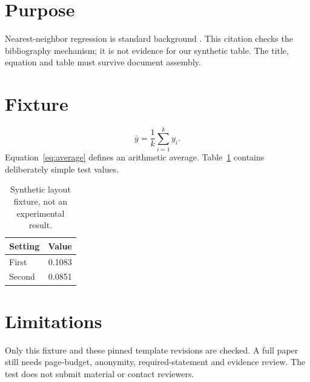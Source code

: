 \begin{abstract}
This original fixture tests document assembly. It is not a submitted or accepted
paper. It exercises a title, an equation, a table, and a citation
under an unchanged official conference style. The data are synthetic test
values, not scientific measurements. Template compilation does not establish
novelty, scientific validity, or complete submission compliance.
\end{abstract}
\section{Purpose}
Nearest-neighbor regression is standard background \cite{hastie2009}.
This citation checks the bibliography mechanism; it is not evidence for our
synthetic table. The title, equation and table must survive document assembly.
\section{Fixture}
\begin{equation}\label{eq:average}
\bar{y}=\frac{1}{k}\sum_{i=1}^{k}y_i.
\end{equation}
Equation~\ref{eq:average} defines an arithmetic average.
Table~\ref{tab:fixture} contains deliberately simple test values.
\begin{table}[h]
\centering
\caption{Synthetic layout fixture, not an experimental result.}
\label{tab:fixture}
\begin{tabular}{lr}
\toprule
Setting & Value \\
\midrule
First & 0.1083 \\
Second & 0.0851 \\
\bottomrule
\end{tabular}
\end{table}
\section*{Limitations}
Only this fixture and these pinned template revisions are checked. A full paper
still needs page-budget, anonymity, required-statement and evidence review.
The test does not submit material or contact reviewers.

